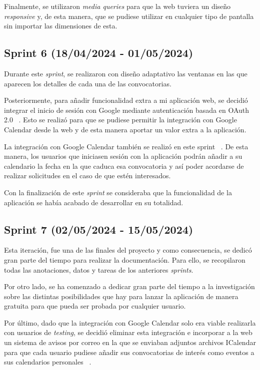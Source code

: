 Finalmente, se utilizaron \textit{media queries} para que la web tuviera un diseño \textit{responsive}  y, de esta manera, que se pudiese utilizar en cualquier tipo de pantalla sin importar las dimensiones de esta.


\subsection{Sprint 6 (18/04/2024 -
01/05/2024)}

Durante este \textit{sprint}, se realizaron con diseño adaptativo las ventanas en las que aparecen los detalles de cada una de las convocatorias.

Posteriormente, para añadir funcionalidad extra a mi aplicación web, se decidió integrar el inicio de sesión con Google mediante autenticación basada en OAuth 2.0 ~\cite{autenticaciongoogle:latex}. Esto se realizó para que se pudiese permitir la integración con Google Calendar desde la web y de esta manera aportar un valor extra a la aplicación.

La integración con Google Calendar también se realizó en este sprint ~\cite{googlecalendar:latex}. De esta manera, los usuarios que iniciasen sesión con la aplicación podrán añadir a su calendario la fecha en la que caduca esa convocatoria y así poder acordarse de realizar solicitudes en el caso de que estén interesados.

Con la finalización de este \textit{sprint} se consideraba que la funcionalidad de la aplicación se había acabado de desarrollar en su totalidad.


\subsection{Sprint 7 (02/05/2024 -
15/05/2024)}
Esta iteración, fue una de las finales del proyecto y como consecuencia, se dedicó gran parte del tiempo para realizar la documentación. Para ello, se recopilaron todas las anotaciones, datos y tareas de los anteriores \textit{sprints}. 

Por otro lado, se ha comenzado a dedicar gran parte del tiempo a la investigación sobre las distintas posibilidades que hay para lanzar la aplicación de manera gratuita para que pueda ser probada por cualquier usuario.

Por último, dado que la integración con Google Calendar solo era viable realizarla con usuarios de \textit{testing}, se decidió eliminar esta integración e incorporar a la web un sistema de avisos por correo en la que se enviaban adjuntos archivos ICalendar para que cada usuario pudiese añadir sus convocatorias de interés como eventos a sus calendarios personales ~\cite{icalendar:latex}.

